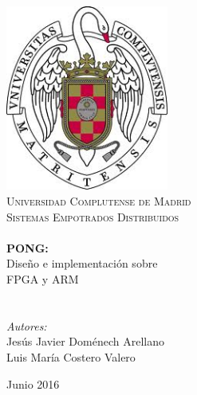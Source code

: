 \begin{titlepage}

  \begin{center}


    \includegraphics[width=0.4\textwidth]{images/escudo.jpg}\\[1cm]    

    \textsc{\LARGE Universidad Complutense de Madrid}\\[1.5cm]

    \textsc{\Large Sistemas Empotrados Distribuidos}\\[0.5cm]


    \HRule \\[0.4cm]
           { \huge {\bfseries PONG:}\vspace{0.3cm}\\
             Diseño e implementación sobre\\FPGA y ARM\\}\\[0.4cm]
           
           \HRule \\[1.5cm]

           \vspace{1.5cm}
           \hfill\emph{Autores:}\\
           \hfill Jesús Javier Doménech Arellano\\
           \hfill Luis María Costero Valero
           
           \vfill
           
           {\large Junio 2016}
           
  \end{center}
  
\end{titlepage}


%
%

